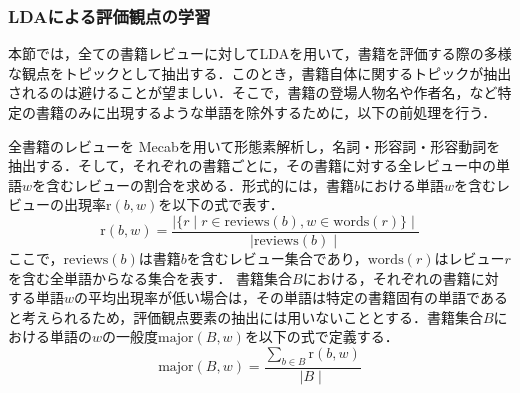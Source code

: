 \documentclass[a4paper,11pt,oneside,openany]{jsbook}
\begin{document}
\subsubsection{LDAによる評価観点の学習}
		\label{subsubsec:learning}
本節では，全ての書籍レビューに対してLDAを用いて，書籍を評価する際の多様な観点をトピックとして抽出する．このとき，書籍自体に関するトピックが抽出されるのは避けることが望ましい．そこで，書籍の登場人物名や作者名，など特定の書籍のみに出現するような単語を除外するために，以下の前処理を行う．
\par
全書籍のレビューを Mecab\cite{mecab}を用いて形態素解析し，名詞・形容詞・形容動詞を抽出する．そして，それぞれの書籍ごとに，その書籍に対する全レビュー中の単語$w$を含むレビューの割合を求める．形式的には，書籍$b$における単語$w$を含むレビューの出現率$\mathrm{r}(b,w)$を以下の式で表す．
\begin{equation}
\mathrm{r}(b,w) = \frac{ \mid\{r \mid r \in \mathrm{reviews}(b), w \in \mathrm{words}(r)\}\mid}{\mid \mathrm{reviews}(b) \mid }
\end{equation}
ここで，$\mathrm{reviews}(b)$は書籍$b$を含むレビュー集合であり，$\mathrm{words}(r)$はレビュー$r$を含む全単語からなる集合を表す．
書籍集合$B$における，それぞれの書籍に対する単語$w$の平均出現率が低い場合は，その単語は特定の書籍固有の単語であると考えられるため，評価観点要素の抽出には用いないこととする．書籍集合$B$における単語の$w$の一般度$\mathrm{major}(B,w)$を以下の式で定義する．
\begin{equation}
\mathrm{major}(B,w) = \frac{\sum_{b\in B}{\mathrm{r}(b,w)}}{\mid B \mid}
\end{equation}
\end{document}
